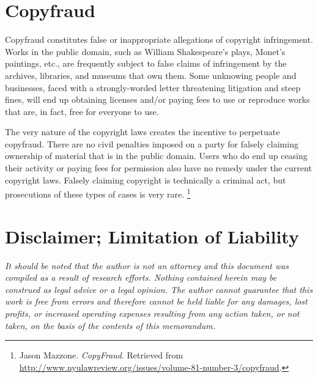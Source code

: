 \documentclass[letterpaper,11pt]{texMemo}
\begin{document}
\section*{Copyfraud}
Copyfraud constitutes false or inappropriate allegations of copyright infringement. Works in the public domain, such as William Shakespeare's plays, Monet's paintings, etc., are frequently subject to false claims of infringement by the archives, libraries, and museums that own them. Some unknowing people and businesses, faced with a strongly-worded letter threatening litigation and steep fines, will end up obtaining licenses and/or paying fees to use or reproduce works that are, in fact, free for everyone to use.

The very nature of the copyright laws creates the incentive to perpetuate copyfraud. There are no civil penalties imposed on a party for falsely claiming ownership of material that is in the public domain. Users who do end up ceasing their activity or paying fees for permission also have no remedy under the current copyright laws. Falsely claiming copyright is technically a criminal act, but prosecutions of these types of cases is very rare.
    \footnote{Jason Mazzone. \emph{CopyFraud}. Retrieved from \href{http://www.nyulawreview.org/issues/volume-81-number-3/copyfraud}{http://www.nyulawreview.org/issues/volume-81-number-3/copyfraud}.
    }



\section*{Disclaimer; Limitation of Liability}
\emph{It should be noted that the author is not an attorney and this document was compiled as a result of research efforts. Nothing contained herein may be construed as legal advice or a legal opinion. The author cannot guarantee that this work is free from errors and therefore cannot be held liable for any damages, lost profits, or increased operating expenses resulting from any action taken, or not taken, on the basis of the contents of this memorandum.}
\begingroup
\nocite{*}
\raggedright

\endgroup
\end{document}
